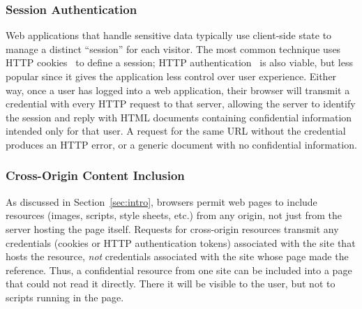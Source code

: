 \documentclass{sig-alternate}
\begin{document}
\subsubsection{Session Authentication}
Web applications that handle sensitive data typically use client-side
state to manage a distinct “session” for each visitor.  The most
common technique uses HTTP cookies~\cite{rfc2109,httpstate} to define
a session; HTTP authentication~\cite{rfc2617} is also viable, but less
popular since it gives the application less control over user
experience.  Either way, once a user has logged into a web
application, their browser will transmit a credential with every HTTP
request to that server, allowing the server to identify the session
and reply with HTML documents containing confidential information
intended only for that user.  A request for the same URL without the
credential produces an HTTP error, or a generic document with no
confidential information.

\subsubsection{Cross-Origin Content Inclusion}
As discussed in Section~\ref{sec:intro}, browsers permit web pages to
include resources (images, scripts, style sheets, etc.) from any
origin, not just from the server hosting the page itself. Requests for
cross-origin resources transmit any credentials (cookies or HTTP
authentication tokens) associated with the site that hosts the
resource, \emph{not} credentials associated with the site whose page
made the reference. Thus, a confidential resource from one site can be
included into a page that could not read it directly.  There it will
be visible to the user, but not to scripts running in the page.

\end{document}
